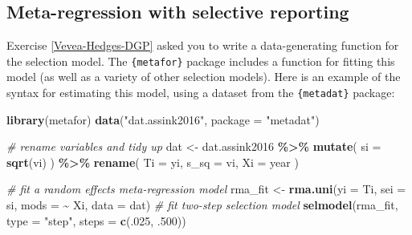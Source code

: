 \documentclass[
]{book}
\newenvironment{Shaded}{\begin{snugshade}}{\end{snugshade}}
\newcommand{\AttributeTok}[1]{\textcolor[rgb]{0.13,0.29,0.53}{#1}}
\newcommand{\CommentTok}[1]{\textcolor[rgb]{0.56,0.35,0.01}{\textit{#1}}}
\newcommand{\DecValTok}[1]{\textcolor[rgb]{0.00,0.00,0.81}{#1}}
\newcommand{\FunctionTok}[1]{\textcolor[rgb]{0.13,0.29,0.53}{\textbf{#1}}}
\newcommand{\NormalTok}[1]{#1}
\newcommand{\OtherTok}[1]{\textcolor[rgb]{0.56,0.35,0.01}{#1}}
\newcommand{\SpecialCharTok}[1]{\textcolor[rgb]{0.81,0.36,0.00}{\textbf{#1}}}
\newcommand{\StringTok}[1]{\textcolor[rgb]{0.31,0.60,0.02}{#1}}
\begin{document}
\subsection{Meta-regression with selective reporting}\label{Vevea-Hedges-estimation}

Exercise \ref{Vevea-Hedges-DGP} asked you to write a data-generating function for the \citet{vevea1995general} selection model.
The \texttt{\{metafor\}} package includes a function for fitting this model (as well as a variety of other selection models).
Here is an example of the syntax for estimating this model, using a dataset from the \texttt{\{metadat\}} package:

\begin{Shaded}
\begin{Highlighting}[]
\FunctionTok{library}\NormalTok{(metafor)}
\FunctionTok{data}\NormalTok{(}\StringTok{"dat.assink2016"}\NormalTok{, }\AttributeTok{package =} \StringTok{"metadat"}\NormalTok{)}

\CommentTok{\# rename variables and tidy up}
\NormalTok{dat }\OtherTok{\textless{}{-}} 
\NormalTok{  dat.assink2016 }\SpecialCharTok{\%\textgreater{}\%}
  \FunctionTok{mutate}\NormalTok{( }\AttributeTok{si =} \FunctionTok{sqrt}\NormalTok{(vi) ) }\SpecialCharTok{\%\textgreater{}\%}
  \FunctionTok{rename}\NormalTok{( }\AttributeTok{Ti =}\NormalTok{ yi, }\AttributeTok{s\_sq =}\NormalTok{ vi, }\AttributeTok{Xi =}\NormalTok{ year )}

\CommentTok{\# fit a random effects meta{-}regression model}
\NormalTok{rma\_fit }\OtherTok{\textless{}{-}} \FunctionTok{rma.uni}\NormalTok{(}\AttributeTok{yi =}\NormalTok{ Ti, }\AttributeTok{sei =}\NormalTok{ si, }\AttributeTok{mods =} \SpecialCharTok{\textasciitilde{}}\NormalTok{ Xi, }\AttributeTok{data =}\NormalTok{ dat)}
\CommentTok{\# fit two{-}step selection model}
\FunctionTok{selmodel}\NormalTok{(rma\_fit, }\AttributeTok{type =} \StringTok{"step"}\NormalTok{, }\AttributeTok{steps =} \FunctionTok{c}\NormalTok{(.}\DecValTok{025}\NormalTok{, .}\DecValTok{500}\NormalTok{))}
\end{Highlighting}
\end{Shaded}
\end{document}

